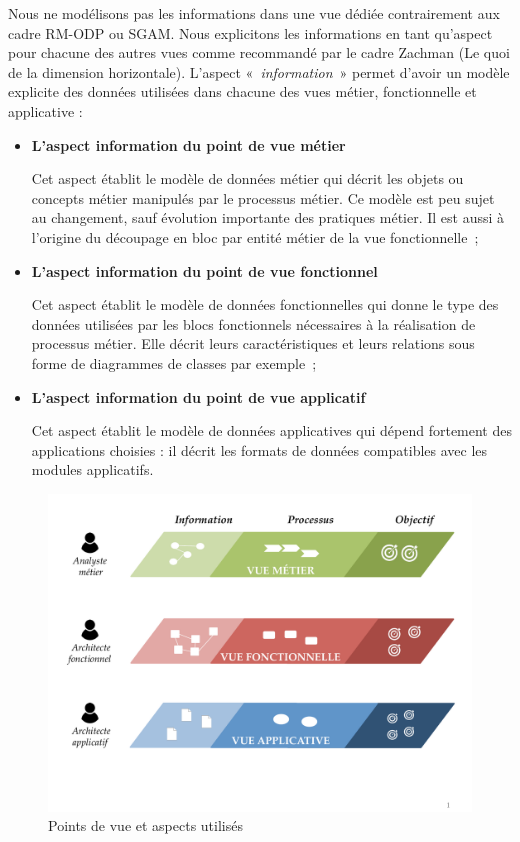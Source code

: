 Nous ne modélisons pas les informations dans une vue dédiée contrairement aux 
cadre RM-ODP ou SGAM. Nous explicitons les informations en tant qu'aspect pour 
chacune des autres vues comme recommandé par le cadre Zachman (Le quoi de la 
dimension horizontale). L'aspect «~\textit{information}~» permet d'avoir un 
modèle explicite des données utilisées dans chacune des vues métier, 
fonctionnelle et applicative :
	\begin{itemize}
	\item \textbf{L'aspect information du point de vue métier}
	
	Cet aspect établit le modèle de données métier qui  décrit les objets ou 
concepts métier manipulés par le processus métier. Ce modèle est peu sujet au 
changement, sauf évolution importante des pratiques métier. Il est aussi à 
l'origine du découpage en bloc par entité métier de la vue fonctionnelle~;
	\item \textbf{L'aspect information du point de vue fonctionnel}
	
	Cet aspect établit le modèle de données fonctionnelles qui donne le type des 
données utilisées par les blocs fonctionnels nécessaires à la réalisation de 
processus métier. Elle décrit leurs caractéristiques et leurs relations sous 
forme de diagrammes de classes par exemple~;
	
	\item \textbf{L'aspect information du point de vue applicatif} 
	
	Cet aspect établit le modèle de données applicatives qui dépend fortement des 
applications choisies : il décrit les formats de données compatibles avec les 
modules applicatifs.
	\end{itemize}
	
\begin{figure}[!ht]
 \begin{center}
  \includegraphics[trim= 0cm 3cm 0cm 0cm, 
width=1\textwidth]{figures/4_demarche/vue_aspect.pdf}
 \end{center}
 \caption{Points de vue et aspects utilisés}
 \label{fig:vue_aspect}
\end{figure}
	
